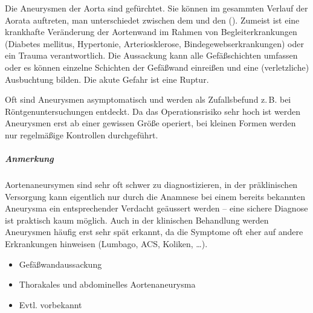 \documentclass[
ngerman,
paper=a4,
asymmetric,
fontsize=10pt,
draft=false,
numbers=noenddot,
bibtotocnumbered,
footnotes=multiple,
]{scrreprt}
\begin{document}
 {%
Die Aneurysmen der Aorta sind gefürchtet. Sie können im
gesammten Verlauf der Aorata auftreten, man unterschiedet
zwischen dem  und
den  ().  Zumeist
ist eine krankhafte Veränderung der Aortenwand im
Rahmen von Begleiterkrankungen (Diabetes mellitus, Hypertonie,
Arteriosklerose,
Bindegewebserkrankungen) oder ein Trauma
verantwortlich. Die Aussackung kann alle Gefäßschichten
umfassen oder es können einzelne Schichten der
Gefäßwand einreißen und eine (verletzliche) Ausbuchtung
bilden. 
Die akute Gefahr ist eine
Ruptur. 

Oft sind Aneurysmen asymptomatisch und werden als
Zufallsbefund z.\,B. bei Röntgenuntersuchungen entdeckt. Da
das Operationsrisiko sehr hoch ist werden Aneurysmen erst ab
einer gewissen Größe operiert, bei kleinen Formen werden nur
regelmäßige Kontrollen durchgeführt.

\subparagraph{Anmerkung} Aortenaneursymen sind sehr oft
schwer zu diagnostizieren, in der präklinischen Versorgung
kann eigentlich nur durch die Anamnese bei einem bereits
bekannten Aneurysma ein entsprechender Verdacht geäussert
werden -- eine sichere Diagnose ist praktisch kaum möglich.
Auch in der klinischen Behandlung werden Aneurysmen häufig
erst sehr spät erkannt, da die Symptome oft eher auf andere
Erkrankungen hinweisen (Lumbago, ACS, Koliken, \ldots). 

 }
{%
 \begin{itemize}
  \item Gefäßwandaussackung
  \item Thorakales und abdominelles Aortenaneurysma
  \item Evtl. vorbekannt
 \end{itemize}
 }{}{}{}
 
\end{document}
